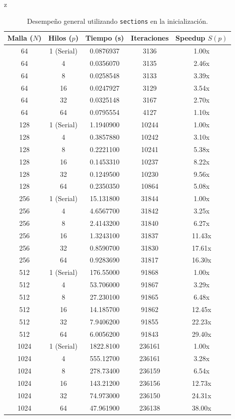 z\documentclass[11pt,a4paper]{article}
\begin{document}
\begin{table}[H]
\centering
\renewcommand{\arraystretch}{1.2}
\small
\begin{tabular}{|c|c|c|c|c|}
\hline
\textbf{Malla ($N$)} & \textbf{Hilos ($p$)} & \textbf{Tiempo (s)} & \textbf{Iteraciones} & \textbf{Speedup $S(p)$} \\ \hline
64 & 1 (Serial) & 0.0876937 & 3136 & 1.00x \\ 
64 & 4 & 0.0356070 & 3135 & 2.46x \\ 
64 & 8 & 0.0258548 & 3133 & 3.39x \\ 
64 & 16 & 0.0247927 & 3129 & 3.54x \\ 
64 & 32 & 0.0325148 & 3167 & 2.70x \\ 
64 & 64 & 0.0795554 & 4127 & 1.10x \\ \hline
128 & 1 (Serial) & 1.1940900 & 10244 & 1.00x \\ 
128 & 4 & 0.3857880 & 10242 & 3.10x \\ 
128 & 8 & 0.2221100 & 10241 & 5.38x \\ 
128 & 16 & 0.1453310 & 10237 & 8.22x \\ 
128 & 32 & 0.1249500 & 10230 & 9.56x \\ 
128 & 64 & 0.2350350 & 10864 & 5.08x \\ \hline
256 & 1 (Serial) & 15.131800 & 31844 & 1.00x \\ 
256 & 4 & 4.6567700 & 31842 & 3.25x \\ 
256 & 8 & 2.4143200 & 31840 & 6.27x \\ 
256 & 16 & 1.3243100 & 31837 & 11.43x \\ 
256 & 32 & 0.8590700 & 31830 & 17.61x \\ 
256 & 64 & 0.9283690 & 31817 & 16.30x \\ \hline
512 & 1 (Serial) & 176.55000 & 91868 & 1.00x \\ 
512 & 4 & 53.706000 & 91867 & 3.29x \\ 
512 & 8 & 27.230100 & 91865 & 6.48x \\ 
512 & 16 & 14.185700 & 91862 & 12.45x \\ 
512 & 32 & 7.9406200 & 91855 & 22.23x \\ 
512 & 64 & 6.0056200 & 91843 & 29.40x \\ \hline
1024 & 1 (Serial) & 1822.8100 & 236161 & 1.00x \\ 
1024 & 4 & 555.12700 & 236161 & 3.28x \\ 
1024 & 8 & 278.73400 & 236159 & 6.54x \\ 
1024 & 16 & 143.21200 & 236156 & 12.73x \\ 
1024 & 32 & 74.973000 & 236150 & 24.31x \\ 
1024 & 64 & 47.961900 & 236138 & 38.00x \\ \hline
\end{tabular}
\caption{Desempeño general utilizando \texttt{sections} en la inicialización.}
\label{tab:resultados_sections}
\end{table}
\end{document}
